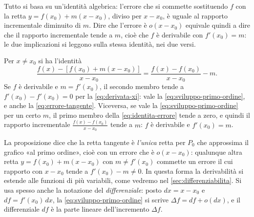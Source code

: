 \begin{schema}
\end{schema}

\begin{strategia}
Tutto si basa su un'identità algebrica: l'errore che si commette sostituendo $f$ con la
retta $y=f(x_{0})+m(x-x_{0})$, diviso per $x-x_{0}$, è uguale al rapporto incrementale
diminuito di $m$. Dire che l'errore è $o(x-x_{0})$ equivale quindi a dire che il rapporto
incrementale tende a $m$, cioè che $f$ è derivabile con $f'(x_{0})=m$: le due implicazioni
si leggono sulla stessa identità, nei due versi.
\end{strategia}

\begin{dimostrazione}
Per $x\neq x_{0}$ si ha l'identità
\begin{equation}\label{eq:identita-errore}
  \frac{f(x)-[f(x_{0})+m(x-x_{0})]}{x-x_{0}}=\frac{f(x)-f(x_{0})}{x-x_{0}}-m .
\end{equation}
Se $f$ è derivabile e $m=f'(x_{0})$, il secondo membro tende a $f'(x_{0})-f'(x_{0})=0$ per
la \eqref{eq:derivata-xi}: vale la \eqref{eq:sviluppo-primo-ordine}, e anche la
\eqref{eq:errore-tangente}. Viceversa, se vale la \eqref{eq:sviluppo-primo-ordine} per un
certo $m$, il primo membro della \eqref{eq:identita-errore} tende a zero, e quindi il
rapporto incrementale $\frac{f(x)-f(x_{0})}{x-x_{0}}$ tende a $m$: $f$ è derivabile e
$f'(x_{0})=m$.
\end{dimostrazione}

La proposizione dice che la retta tangente è \emph{l'unica} retta per $P_{0}$ che
approssima il grafico «al primo ordine», cioè con un errore che è $o(x-x_{0})$: qualunque
altra retta $y=f(x_{0})+m(x-x_{0})$ con $m\neq f'(x_{0})$ commette un errore il cui
rapporto con $x-x_{0}$ tende a $f'(x_{0})-m\neq0$. In questa forma la derivabilità si
estende alle funzioni di più variabili, come vedremo nel \cref{sec:differenziabilita}.
Si usa spesso anche la notazione del \emph{differenziale}: posto $dx=x-x_{0}$ e
$df=f'(x_{0})\,dx$, la \eqref{eq:sviluppo-primo-ordine} si scrive
$\Delta f=df+o(dx)$, e il differenziale $df$ è la parte lineare dell'incremento $\Delta f$.

